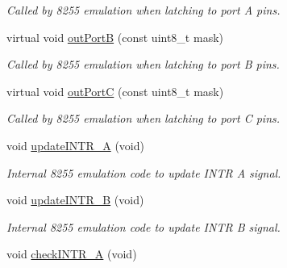 \begin{DoxyCompactItemize}
\begin{DoxyCompactList}\small\item\em Called by 8255 emulation when latching to port A pins. \end{DoxyCompactList}\item 
\hypertarget{classIntel8255_a3004cbfc1a1eade447d2e312bc1faa29}{virtual void \hyperlink{classIntel8255_a3004cbfc1a1eade447d2e312bc1faa29}{out\-Port\-B} (const uint8\-\_\-t mask)}\label{classIntel8255_a3004cbfc1a1eade447d2e312bc1faa29}

\begin{DoxyCompactList}\small\item\em Called by 8255 emulation when latching to port B pins. \end{DoxyCompactList}\item 
\hypertarget{classIntel8255_afaff12790fc1b0cf538c7b1a4f27d804}{virtual void \hyperlink{classIntel8255_afaff12790fc1b0cf538c7b1a4f27d804}{out\-Port\-C} (const uint8\-\_\-t mask)}\label{classIntel8255_afaff12790fc1b0cf538c7b1a4f27d804}

\begin{DoxyCompactList}\small\item\em Called by 8255 emulation when latching to port C pins. \end{DoxyCompactList}\item 
\hypertarget{classIntel8255_a862582a9f1779bb8af99365361b63c03}{void \hyperlink{classIntel8255_a862582a9f1779bb8af99365361b63c03}{update\-I\-N\-T\-R\-\_\-\-A} (void)}\label{classIntel8255_a862582a9f1779bb8af99365361b63c03}

\begin{DoxyCompactList}\small\item\em Internal 8255 emulation code to update I\-N\-T\-R A signal. \end{DoxyCompactList}\item 
\hypertarget{classIntel8255_ad2adbe70f430d36a9f4f27124de3335d}{void \hyperlink{classIntel8255_ad2adbe70f430d36a9f4f27124de3335d}{update\-I\-N\-T\-R\-\_\-\-B} (void)}\label{classIntel8255_ad2adbe70f430d36a9f4f27124de3335d}

\begin{DoxyCompactList}\small\item\em Internal 8255 emulation code to update I\-N\-T\-R B signal. \end{DoxyCompactList}\item 
\hypertarget{classIntel8255_a5a0199f3c744cd05b81936aaf58dc394}{void \hyperlink{classIntel8255_a5a0199f3c744cd05b81936aaf58dc394}{check\-I\-N\-T\-R\-\_\-\-A} (void)}\label{classIntel8255_a5a0199f3c744cd05b81936aaf58dc394}


\end{DoxyCompactItemize}
